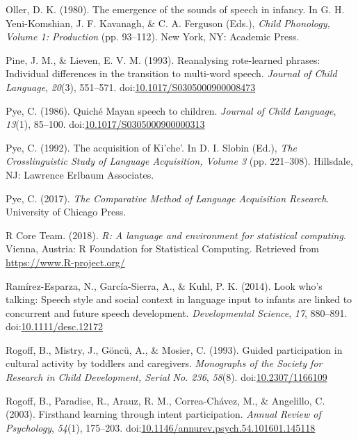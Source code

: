 \documentclass[floatsintext,man]{apa6}
\theoremstyle{definition}
\theoremstyle{definition}
\theoremstyle{definition}
\theoremstyle{remark}
\begin{document}
\hypertarget{ref-oller1980emergence}{}
Oller, D. K. (1980). The emergence of the sounds of speech in infancy.
In G. H. Yeni-Komshian, J. F. Kavanagh, \& C. A. Ferguson (Eds.),
\emph{Child Phonology, Volume 1: Production} (pp. 93--112). New York,
NY: Academic Press.

\hypertarget{ref-pine1993reanalysing}{}
Pine, J. M., \& Lieven, E. V. M. (1993). Reanalysing rote-learned
phrases: Individual differences in the transition to multi-word speech.
\emph{Journal of Child Language}, \emph{20}(3), 551--571.
doi:\href{https://doi.org/10.1017/S0305000900008473}{10.1017/S0305000900008473}

\hypertarget{ref-pye1986quiche}{}
Pye, C. (1986). Quiché Mayan speech to children. \emph{Journal of Child
Language}, \emph{13}(1), 85--100.
doi:\href{https://doi.org/10.1017/S0305000900000313}{10.1017/S0305000900000313}

\hypertarget{ref-pye1992acquisition}{}
Pye, C. (1992). The acquisition of Ki'che'. In D. I. Slobin (Ed.),
\emph{The Crosslinguistic Study of Language Acquisition, Volume 3} (pp.
221--308). Hillsdale, NJ: Lawrence Erlbaum Associates.

\hypertarget{ref-pye2017comparative}{}
Pye, C. (2017). \emph{The Comparative Method of Language Acquisition
Research}. University of Chicago Press.

\hypertarget{ref-R-base}{}
R Core Team. (2018). \emph{R: A language and environment for statistical
computing}. Vienna, Austria: R Foundation for Statistical Computing.
Retrieved from \url{https://www.R-project.org/}

\hypertarget{ref-ramirezesparza2014look}{}
Ramírez-Esparza, N., García-Sierra, A., \& Kuhl, P. K. (2014). Look
who's talking: Speech style and social context in language input to
infants are linked to concurrent and future speech development.
\emph{Developmental Science}, \emph{17}, 880--891.
doi:\href{https://doi.org/10.1111/desc.12172}{10.1111/desc.12172}

\hypertarget{ref-rogoff1993guided}{}
Rogoff, B., Mistry, J., Göncü, A., \& Mosier, C. (1993). Guided
participation in cultural activity by toddlers and caregivers.
\emph{Monographs of the Society for Research in Child Development,
Serial No. 236}, \emph{58}(8).
doi:\href{https://doi.org/10.2307/1166109}{10.2307/1166109}

\hypertarget{ref-rogoff2003firsthand}{}
Rogoff, B., Paradise, R., Arauz, R. M., Correa-Chávez, M., \& Angelillo,
C. (2003). Firsthand learning through intent participation. \emph{Annual
Review of Psychology}, \emph{54}(1), 175--203.
doi:\href{https://doi.org/10.1146/annurev.psych.54.101601.145118}{10.1146/annurev.psych.54.101601.145118}
\end{document}
